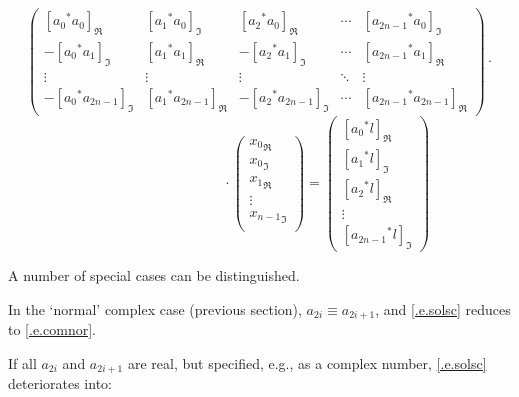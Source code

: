 \begin{displaymath}
	\left( \begin{array}{ccccc}
	{\left[ {a_{0}}^{*}a_{0}\right]}_{\Re} &
	{\left[ {a_{1}}^{*}a_{0}\right]}_{\Im} &
	{\left[ {a_{2}}^{*}a_{0}\right]}_{\Re} &
	\cdots &
	{\left[ {a_{2n-1}}^{*}a_{0}\right]}_{\Im}  \\
	-{\left[ {a_{0}}^{*}a_{1}\right]}_{\Im} &
	{\left[ {a_{1}}^{*}a_{1}\right]}_{\Re} &
	-{\left[ {a_{2}}^{*}a_{1}\right]}_{\Im} &
	\cdots &
	{\left[ {a_{2n-1}}^{*}a_{1}\right]}_{\Re} \\
	\vdots       & \vdots & \vdots      & \ddots & \vdots \\
	-{\left[ {a_{0}}^{*}a_{2n-1}\right]}_{\Im} &
	{\left[ {a_{1}}^{*}a_{2n-1}\right]}_{\Re} &
	-{\left[ {a_{2}}^{*}a_{2n-1}\right]}_{\Im} &
	\cdots &
	{\left[ {a_{2n-1}}^{*}a_{2n-1}\right]}_{\Re}
	       \end{array} \right) \cdot
\end{displaymath}
\begin{equation}
	\hspace{4cm} \cdot \left( \begin{array} {c}
		     {x_{0}}_{\Re} \\
			{x_{0}}_{\Im} \\
			{x_{1}}_{\Re} \\
			\vdots \\
			{x_{n-1}}_{\Im} \\
		     \end{array} \right) =
	\left( \begin{array} {c}
	{\left[ {a_{0}}^{*}l\right]}_{\Re} \\
	{\left[ {a_{1}}^{*}l\right]}_{\Im} \\
	{\left[ {a_{2}}^{*}l\right]}_{\Re} \\
	\vdots \\
	{\left[ {a_{2n-1}}^{*}l\right]}_{\Im}
	       \end{array} \right)
			\label{.e.solsc}
\end{equation}

A number of special cases can be distinguished.

In the `normal' complex case (previous section), $a_{2i}\equiv a_{2i+1}$, and
\eqref{.e.solsc} reduces to \eqref{.e.comnor}.

If all $a_{2i}$ and $a_{2i+1}$ are real, but specified, e.g., as a complex
number, \eqref{.e.solsc} deteriorates into:

